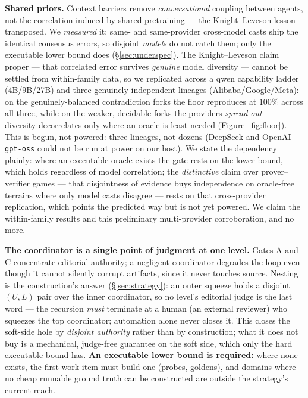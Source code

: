\documentclass[11pt]{article}
\newcommand{\code}[1]{\texttt{#1}}
\begin{document}
\textbf{Shared priors.} Context barriers remove \emph{conversational} coupling between agents, not the
correlation induced by shared pretraining --- the Knight--Leveson lesson \citep{knight1986independence}
transposed. We \emph{measured} it: same- and same-provider cross-model casts ship the identical
consensus errors, so disjoint \emph{models} do not catch them; only the executable lower bound does
(\S\ref{sec:underspec}). The Knight--Leveson claim proper --- that correlated error survives
\emph{genuine} model diversity --- cannot be settled from within-family data, so we replicated across a
qwen capability ladder (4B/9B/27B) and three genuinely-independent lineages (Alibaba/Google/Meta): on the
genuinely-balanced contradiction forks the floor reproduces at $100\%$ across all three, while on the
weaker, decidable forks the providers \emph{spread out} --- diversity decorrelates only where an oracle
is least needed (Figure~\ref{fig:floor}). This is begun, not powered: three lineages, not dozens
(DeepSeek and OpenAI \code{gpt-oss} could not be run at power on our host). We state the dependency
plainly: where an executable oracle exists the gate rests on the lower bound, which holds regardless of
model correlation; the \emph{distinctive} claim over prover--verifier games --- that disjointness of
evidence buys independence on oracle-free terrains where only model casts disagree --- rests on that
cross-provider replication, which points the predicted way but is not yet powered. We claim the
within-family results and this preliminary multi-provider corroboration, and no more.

\textbf{The coordinator is a single point of judgment at one level.} Gates A and C concentrate editorial
authority; a negligent coordinator degrades the loop even though it cannot silently corrupt
artifacts, since it never touches source. Nesting is the construction's answer (\S\ref{sec:strategy}):
an outer squeeze holds a disjoint $(U,L)$ pair over the inner coordinator, so no level's editorial
judge is the last word --- the recursion \emph{must} terminate at a human (an external reviewer) who squeezes the
top coordinator; automation alone never closes it. This closes the soft-side hole by \emph{disjoint authority} rather than by
construction; what it does not buy is a mechanical, judge-free guarantee on the soft side, which only
the hard executable bound has. \textbf{An executable lower bound is required:} where
none exists, the first work item must build one (probes, goldens), and domains where no cheap
runnable ground truth can be constructed are outside the strategy's current reach.
\end{document}

